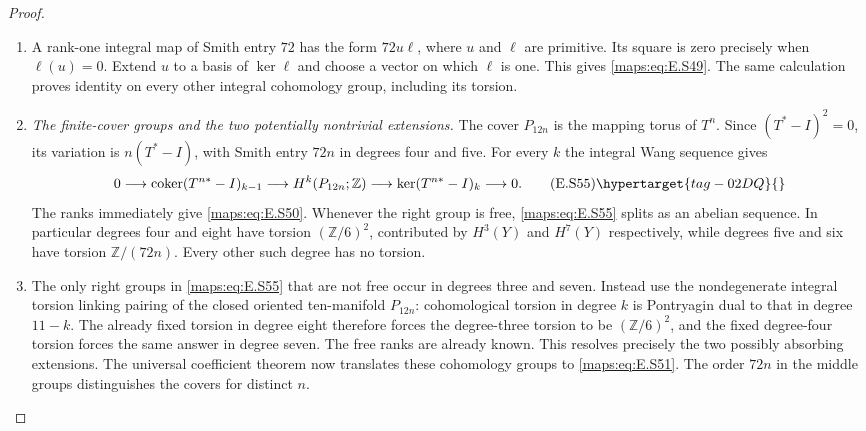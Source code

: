 \begin{proof}
\begin{enumerate}[label={$\langle1\rangle$\arabic*.},leftmargin=*]
\item A rank-one integral map of Smith entry $72$ has the
form $72u\ell$, where $u$ and $\ell$ are primitive.
Its square is zero precisely when $\ell(u)=0$.
Extend $u$ to a basis of $\ker\ell$ and choose a vector
on which $\ell$ is one. This gives \eqref{maps:eq:E.S49}. The same
calculation proves identity on every other integral
cohomology group, including its torsion.

\item \emph{The finite-cover groups and the two potentially nontrivial extensions.}
The cover $P_{12n}$ is the mapping torus of $T^n$.
Since $(T^*-I)^2=0$, its variation is $n(T^*-I)$,
with Smith entry $72n$ in degrees four and five.
For every $k$ the integral Wang sequence gives
\[
 0\longrightarrow\operatorname{coker}(T^{n*}-I)_{k-1}
 \longrightarrow H^k(P_{12n};\mathbb Z)
 \longrightarrow\ker(T^{n*}-I)_k\longrightarrow0.
 \tag{E.S55}\hypertarget{tag-02DQ}{}\label{maps:eq:E.S55}
\]
The ranks immediately give \eqref{maps:eq:E.S50}. Whenever the right
group is free, \eqref{maps:eq:E.S55} splits as an abelian sequence.
In particular degrees four and eight have torsion
$(\mathbb Z/6)^2$, contributed by $H^3(Y)$ and $H^7(Y)$
respectively, while degrees five and six have torsion
$\mathbb Z/(72n)$. Every other such degree has no torsion.

\item The only right groups in \eqref{maps:eq:E.S55} that are not free
occur in degrees three and seven.  Instead use the
nondegenerate integral torsion linking pairing of the
closed oriented ten-manifold $P_{12n}$: cohomological
torsion in degree $k$ is Pontryagin dual to that in
degree $11-k$. The already fixed torsion in degree
eight therefore forces the degree-three torsion to
be $(\mathbb Z/6)^2$, and the fixed degree-four torsion
forces the same answer in degree seven. The free
ranks are already known. This resolves precisely
the two possibly absorbing extensions. The universal
coefficient theorem now translates these cohomology
groups to \eqref{maps:eq:E.S51}. The order $72n$ in the middle
groups distinguishes the covers for distinct $n$.
\end{enumerate}
\end{proof}

